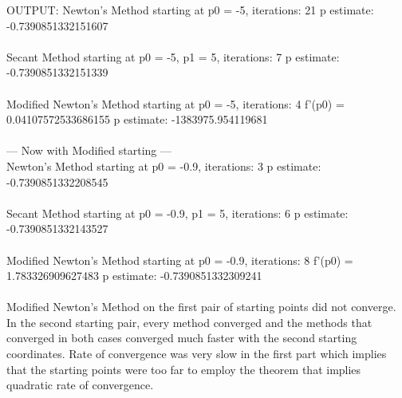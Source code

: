 \documentclass{amsart}
\begin{document}
    OUTPUT:
    {\small
        Newton's Method starting at p0 = -5, iterations: 21 p estimate: -0.7390851332151607\\ \\

        Secant Method starting at p0 = -5, p1 = 5, iterations: 7 p estimate: -0.7390851332151339\\ \\

        Modified Newton's Method starting at p0 = -5, iterations: 4 f'(p0) = 0.04107572533686155 p estimate: -1383975.954119681\\ \\

         --- Now with Modified starting --- \\
        Newton's Method starting at p0 = -0.9, iterations: 3 p estimate: -0.7390851332208545\\ \\

        Secant Method starting at p0 = -0.9, p1 = 5, iterations: 6 p estimate: -0.7390851332143527\\ \\

        Modified Newton's Method starting at p0 = -0.9, iterations: 8 f'(p0) = 1.783326909627483 p estimate: -0.7390851332309241\\ \\

    }
    Modified Newton's Method on the first pair of starting points did not converge. In the second
    starting pair, every method converged and the methods that converged in both cases converged much faster with the second starting coordinates.
    Rate of convergence was very slow in the first part which implies that the starting points were too far to employ the theorem that implies quadratic rate of convergence.
\end{document}
